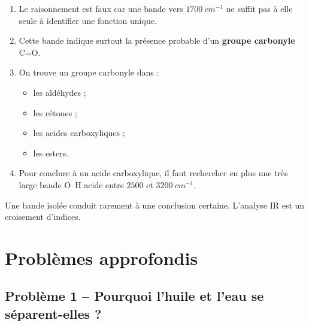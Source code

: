 \documentclass[11pt,a4paper]{article}
\begin{document}
\begin{corrigebox}
\begin{enumerate}[label=\arabic*)]
    \item Le raisonnement est faux car une bande vers \(1700\ \si{cm^{-1}}\) ne suffit pas à elle seule à identifier une fonction unique.
    
    \item Cette bande indique surtout la présence probable d'un \textbf{groupe carbonyle} C=O.
    
    \item On trouve un groupe carbonyle dans :
    \begin{itemize}
        \item les aldéhydes ;
        \item les cétones ;
        \item les acides carboxyliques ;
        \item les esters.
    \end{itemize}
    
    \item Pour conclure à un acide carboxylique, il faut rechercher en plus une très large bande O--H acide entre \(2500\) et \(3200\ \si{cm^{-1}}\).
\end{enumerate}

\begin{attentionbox}
Une bande isolée conduit rarement à une conclusion certaine.  
L'analyse IR est un croisement d'indices.
\end{attentionbox}
\end{corrigebox}

\section{Problèmes approfondis}

\subsection{Problème 1 -- Pourquoi l'huile et l'eau se séparent-elles ?}
\end{document}
